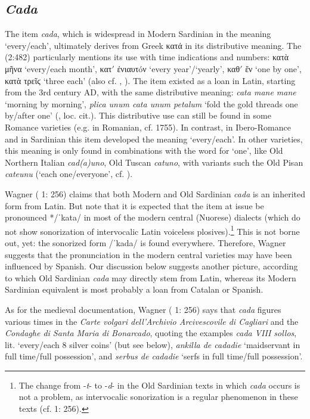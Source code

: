 \documentclass[output=paper,colorlinks,citecolor=brown]{langscibook}
\begin{document}
\subsection{\textit{Cada}}\label{sec:men4.1}
The item \textit{cada}, which is widespread in Modern Sardinian in the meaning ‘every\slash each’, ultimately derives from Greek κατά in its distributive meaning. The  (2:482) particularly mentions its use with time indications and numbers: κατὰ μῆνα ‘every\slash each month’, κατ\textit{$\prime$} ἐνιαυτóν ‘every year'/‘yearly’, καθ\textit{$\prime$} ἕν ‘one by one’, κατὰ τρεῖϛ ‘three each’ (also cf. \cite[][220]{Rohlfs1969}, \cite[][254--255]{Hofmann1972}). The item existed as a loan in Latin, starting from the 3rd century AD, with the same distributive meaning: \textit{cata mane mane} ‘morning by morning’, \textit{plica unum cata unum petalum} ‘fold the gold threads one by/after one’ (, loc. cit.). This distributive use can still be found in some Romance varieties (e.g. in Romanian, cf.  1755). In contrast, in Ibero-Romance and in Sardinian this item developed the meaning ‘every/each’. In other varieties, this meaning is only found in combinations with the word for ‘one’, like Old Northern Italian \textit{cad(a)uno}, Old Tuscan \textit{catuno}, with variants such the Old Pisan \textit{cateunu} (‘each one/everyone’, cf. \cite[][220--221]{Rohlfs1969}). 

Wagner ( 1: 256) claims that both Modern and Old Sardinian \textit{cada} is an inherited form from Latin. But note that it is expected that the item at issue be pronounced */ˈkata/ in most of the modern central (Nuorese) dialects (which do not show sonorization of intervocalic Latin voiceless plosives).\footnote{The change from -\textit{t}- to -\textit{d}- in the Old Sardinian texts in which \textit{cada} occurs is not a problem, as intervocalic sonorization is a regular phenomenon in these texts (cf.  1: 256).} This is not borne out, yet: the sonorized form /ˈkada/ is found everywhere. Therefore, Wagner suggests that the pronunciation in the modern central varieties may have been influenced by Spanish. Our discussion below suggests another picture, according to which Old Sardinian \textit{cada} may directly stem from Latin, whereas its Modern Sardinian equivalent is most probably a loan from Catalan or Spanish.

As for the medieval documentation, Wagner ( 1: 256) says that \textit{cada} figures various times in the \textit{Carte volgari dell'Archivio Arcivescovile di Cagliari} and the \textit{Condaghe di Santa Maria di Bonarcado}, quoting the examples \textit{cada VIII sollos}, lit. ‘every/each 8 silver coins’ (but see below), \textit{ankilla de cadadie} ‘maidservant in full time/full possession’, and \textit{serbus de cadadie} ‘serfs in full time/full possession’.
\end{document}
